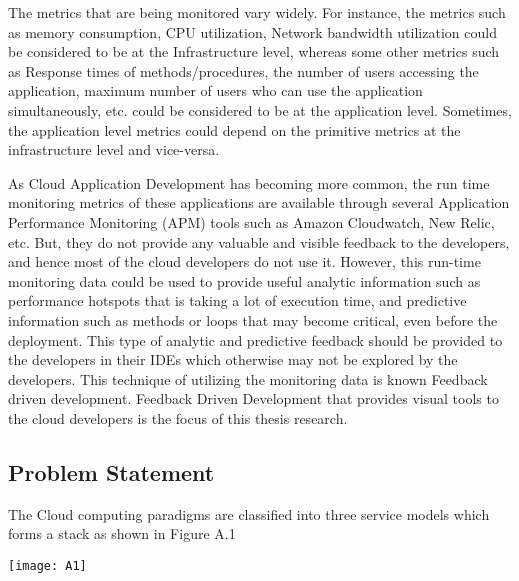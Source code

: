 \documentclass[article,type=msc,colorback,12pt,accentcolor=tud7b]{tudthesis}
\begin{document}
	\par The metrics that are being monitored vary widely. For instance, the metrics such as memory consumption, CPU utilization, Network bandwidth utilization could be considered to be at the Infrastructure level, whereas some other metrics such as Response times of methods/procedures, the number of users accessing the application, maximum number of users who can use the application simultaneously, etc. could be considered to be at the application level. Sometimes, the application level metrics could depend on the primitive metrics at the infrastructure level and vice-versa.
	
	\par As Cloud Application Development has becoming more common, the run time monitoring metrics of these applications are available through several Application Performance Monitoring (APM) tools such as Amazon Cloudwatch, New Relic, etc. But, they do not provide any valuable and visible feedback to the developers, and hence most of the cloud developers do not use it. However, this run-time monitoring data could be used to provide useful analytic information such as performance hotspots that is taking a lot of execution time, and predictive information such as methods or loops that may become critical, even before the deployment. This type of analytic and predictive feedback should be provided to the developers in their IDEs which otherwise may not be explored by the developers. This technique of utilizing the monitoring data is known Feedback driven development. Feedback Driven Development that provides visual tools to the cloud developers is the focus of this thesis research.	
	
	\subsection{Problem Statement}	
	
The Cloud computing paradigms are classified into three service models which forms a stack as shown in Figure A.1 

\begin{center}
\texttt{[image: A1]}
\end{center}

%	
%	
%	
	
\end{document}
